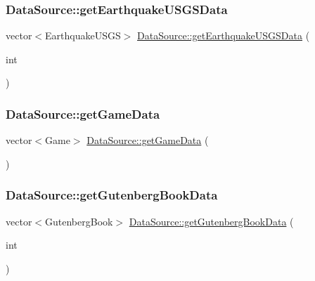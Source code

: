 \subsubsection{\texorpdfstring{Data\+Source\+::get\+Earthquake\+U\+S\+G\+S\+Data}{DataSource::getEarthquakeUSGSData}}
{\footnotesize\ttfamily vector$<$Earthquake\+U\+S\+GS$>$ \mbox{\hyperlink{namespacebridges_1_1_data_source_ae9f6a40dae8b8a15ebe43aca34931b43}{Data\+Source\+::get\+Earthquake\+U\+S\+G\+S\+Data}} (\begin{DoxyParamCaption}\item[{int}]{ }\end{DoxyParamCaption})\hspace{0.3cm}{\ttfamily [friend]}}

\mbox{\label{classbridges_1_1_server_comm_aaf9715981dcd976f93624bd3aa22183f}} 
\subsubsection{\texorpdfstring{Data\+Source\+::get\+Game\+Data}{DataSource::getGameData}}
{\footnotesize\ttfamily vector$<$Game$>$ \mbox{\hyperlink{namespacebridges_1_1_data_source_a96a28cc7f2a6013fe09b07cc53c7432f}{Data\+Source\+::get\+Game\+Data}} (\begin{DoxyParamCaption}{ }\end{DoxyParamCaption})\hspace{0.3cm}{\ttfamily [friend]}}

\mbox{\label{classbridges_1_1_server_comm_a8daad6bf2db8bf4f0b0f9914022b6aa4}} 
\subsubsection{\texorpdfstring{Data\+Source\+::get\+Gutenberg\+Book\+Data}{DataSource::getGutenbergBookData}}
{\footnotesize\ttfamily vector$<$Gutenberg\+Book$>$ \mbox{\hyperlink{namespacebridges_1_1_data_source_a8146b00565286727e8206e377d9ff5bd}{Data\+Source\+::get\+Gutenberg\+Book\+Data}} (\begin{DoxyParamCaption}\item[{int}]{ }\end{DoxyParamCaption})\hspace{0.3cm}{\ttfamily [friend]}}


